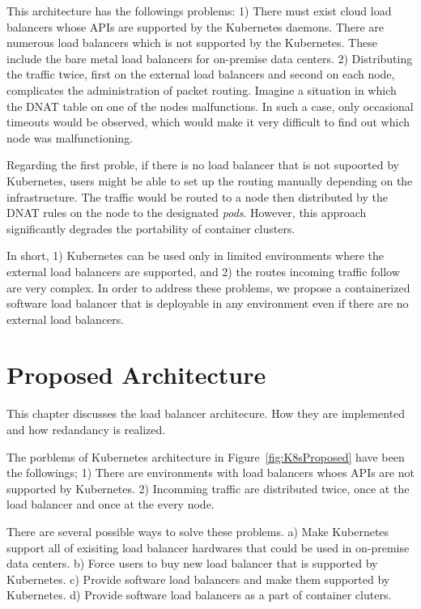 This architecture has the followings problems: 
1) There must exist cloud load balancers whose APIs are supported by the Kubernetes daemons.
There are numerous load balancers which is not supported by the Kubernetes.
These include the bare metal load balancers for on-premise data centers.
2) Distributing the traffic twice, first on the external load balancers and second on each node, complicates the administration of packet routing. 
Imagine a situation in which the DNAT table on one of the nodes malfunctions.
In such a case, only occasional timeouts would be observed, which would make it very difficult to find out which node was malfunctioning.   

Regarding the first proble, if there is no load balancer that is not supoorted by Kubernetes, users might be able to set up the routing manually depending on the infrastructure.
The traffic would be routed to a node then distributed by the DNAT rules on the node to the designated {\em pods}.
However, this approach significantly degrades the portability of container clusters.

In short, 1) Kubernetes can be used only in limited environments where the external load balancers are supported, and 2) the routes incoming traffic follow are very complex.
In order to address these problems, we propose a containerized software load balancer 
that is deployable in any environment even if there are no external load balancers.

\section{Proposed Architecture}

This chapter discusses the load balancer architecure.
How they are implemented and how redandancy is realized.

The porblems of Kubernetes architecture in Figure~\ref{fig:K8sProposed} have been the followings;
1) There are environments with load balancers whoes APIs are not supported by Kubernetes.
2) Incomming traffic are distributed twice, once at the load balancer and once at the every node.

There are several possible ways to solve these problems.
a) Make Kubernetes support all of exisiting load balancer hardwares that could be used in on-premise data centers.
b) Force users to buy new load balancer that is supported by Kubernetes.
c) Provide software load balancers and make them supported by Kubernetes.
d) Provide software load balancers as a part of container cluters.


